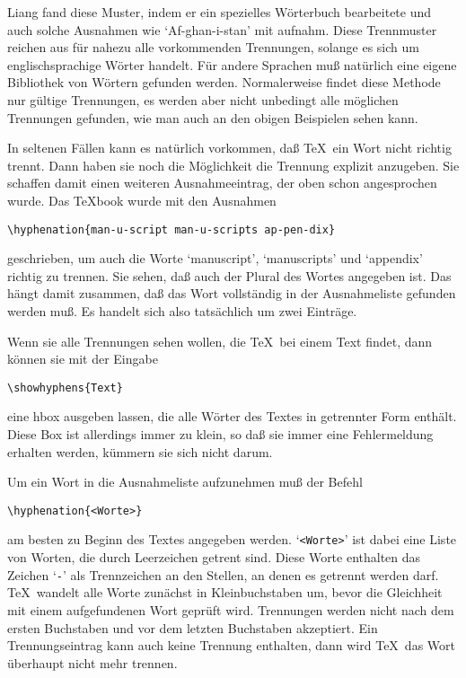 \begin{appendix}
Liang fand diese Muster, indem er ein spezielles W\"orterbuch
bearbeitete und auch solche Ausnahmen wie `Af-ghan-i-stan' mit
aufnahm. Diese Trennmuster reichen aus f\"ur nahezu alle vorkommenden
Trennungen, solange es sich um englischsprachige W\"orter handelt. F\"ur
andere Sprachen mu\ss{} nat\"urlich eine eigene 
Bibliothek von W\"ortern
gefunden werden. Normalerweise findet diese Methode nur g\"ultige
Trennungen, es werden aber nicht unbedingt alle m\"oglichen Trennungen
gefunden, wie man auch an den obigen Beispielen sehen kann.

In seltenen F\"allen kann es nat\"urlich vorkommen, da\ss{} \TeX\ ein Wort
nicht richtig trennt. Dann haben sie noch die M\"oglichkeit die Trennung
explizit anzugeben. Sie schaffen damit einen weiteren Ausnahmeeintrag,
der oben schon angesprochen wurde. Das \TeX book wurde mit den
Ausnahmen
\begin{verbatim}
\hyphenation{man-u-script man-u-scripts ap-pen-dix}
\end{verbatim}
geschrieben, um auch die Worte `manuscript', `manuscripts' und
`appendix' richtig zu trennen. Sie sehen, da\ss{} auch der Plural des
Wortes angegeben ist. Das h\"angt damit zusammen, da\ss{} das Wort
vollst\"andig in der Ausnahmeliste gefunden werden mu\ss{}. Es handelt sich
also tats\"achlich um zwei Eintr\"age.

Wenn sie alle Trennungen sehen wollen, die \TeX\ bei einem Text
findet, dann k\"onnen sie mit der Eingabe
\begin{verbatim}
\showhyphens{Text}
\end{verbatim}
eine 
hbox ausgeben lassen, die alle W\"orter des Textes in getrennter
Form enth\"alt. Diese Box ist allerdings immer zu klein, so da\ss{} sie
immer eine 
Fehlermeldung erhalten werden, k\"ummern sie sich nicht darum.

Um ein Wort in die Ausnahmeliste aufzunehmen mu\ss{} der Befehl
\begin{verbatim}
\hyphenation{<Worte>}
\end{verbatim}
am besten zu Beginn des Textes angegeben werden. `\verb|<Worte>|' ist
dabei eine Liste von Worten, die durch 
Leerzeichen getrent sind. Diese
Worte enthalten das Zeichen `\verb|-|' als Trennzeichen an den
Stellen, an denen es getrennt werden darf. \TeX\ wandelt alle Worte
zun\"achst in 
Kleinbuchstaben um, bevor die Gleichheit mit einem
aufgefundenen Wort gepr\"uft wird. Trennungen werden nicht nach dem
ersten Buchstaben und vor dem letzten Buchstaben akzeptiert. Ein
Trennungseintrag kann auch keine Trennung enthalten, dann wird \TeX\
das Wort \"uberhaupt nicht mehr trennen.


\end{appendix}

